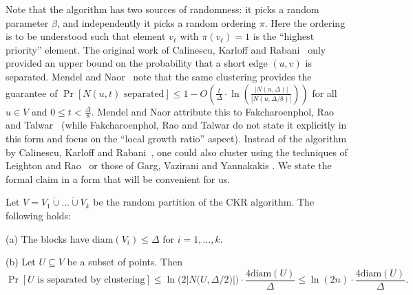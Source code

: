 Note that the algorithm has two sources of randomness: it picks a random parameter $\beta$,
and independently it picks a random ordering $\pi$. Here the ordering is to be understood such that 
element $v_{\ell}$ with $\pi(v_{\ell}) = 1$ is the ``highest priority'' element. 
The original work of Calinescu, Karloff and Rabani~\cite{DBLP:journals/siamcomp/CalinescuKR04} only provided an upper bound on the probability that a short edge $(u,v)$ is separated. Mendel and Naor~\cite{RamseyPartitions-MendelNaorFOCS06} note that the same clustering provides the guarantee of
$\Pr[N(u,t)\textrm{ separated}] \leq 1 - O(\frac{t}{\Delta} \cdot \ln( \frac{|N(u,\Delta)|}{|N(u,\Delta/8)|}))$
for all $u \in V$ and $0\leq t<\frac{\Delta}{8}$.
Mendel and Naor attribute this
to Fakcharoenphol, Rao and Talwar~\cite{TreeMetricFakcharoenpholRaoTalwar-JCSS04} (while Fakcharoenphol, Rao and Talwar\cite{TreeMetricFakcharoenpholRaoTalwar-JCSS04} do not state it explicitly in this form and focus on the ``local growth ratio'' aspect).
Instead of the algorithm by Calinescu, Karloff and Rabani~\cite{DBLP:journals/siamcomp/CalinescuKR04},
one could also cluster using the techniques of Leighton and Rao~\cite{RegionGrowing-LeightonRao-JACM1999} or those of Garg, Vazirani and Yannakakis \cite{Garg93approximatemax-flow}.
We state the formal claim in a form that will be convenient for us.
\begin{theorem} \label{thm:ProbUSeperatedByClustering}
  Let $V = V_1 \dot{\cup} \ldots \dot{\cup} V_k$ be the random partition of the CKR algorithm. The following holds:
  \begin{enumerate*}
  \item[(a)] The blocks have $\textrm{diam}(V_i) \leq \Delta$ for $i=1,\ldots,k$.
  \item[(b)] Let $U \subseteq V$ be a subset of points. Then \vspace{-2mm}
  \[
  \Pr[U\textrm{ is separated by clustering}] \leq \ln\big(2\big|N\big(U,\Delta/2 \big)\big|\big) \cdot \frac{4\textrm{diam}(U)}{\Delta} \leq \ln(2n) \cdot \frac{4\textrm{diam}(U)}{\Delta}.
\]
\end{enumerate*}
\end{theorem}
